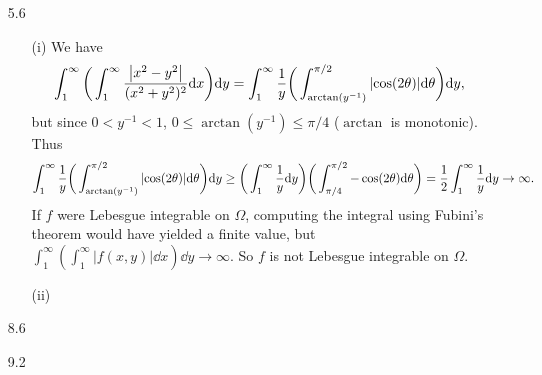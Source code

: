 \documentclass[11pt]{article}
\begin{document}
\begin{enumerate}
    \item[5.6] \begin{enumerate}
        \item[(i)] We have \[\int_1^\infty\bigg(\int_1^\infty \frac{\abs{x^2-y^2}}{(x^2+y^2)^2} \dd x\bigg)\dd y = \int_{1}^\infty \frac{1}{y} \bigg(\int_{\arctan(y^{-1})}^{\pi/2}\abs{\cos(2\theta)}\dd \theta\bigg) \dd y,\] but since $0<y^{-1}< 1$, $0 \leq \arctan(y^{-1})\leq \pi/4$ ($\arctan$ is monotonic). Thus \[\int_{1}^\infty \frac{1}{y} \bigg(\int_{\arctan(y^{-1})}^{\pi/2}\abs{\cos(2\theta)}\dd \theta\bigg) \dd y\geq \bigg(\int_{1}^\infty \frac{1}{y} \dd y\bigg)\bigg(\int_{\pi/4}^{\pi/2}-\cos(2\theta)\dd \theta\bigg) = \frac{1}{2}\int_1^\infty \frac{1}{y}\dd y \to \infty.\] If $f$ were Lebesgue integrable on $\Omega$, computing the integral using Fubini's theorem would have yielded a finite value, but $\int_1^\infty (\int_1^\infty |f(x,y)|\dd x) \dd y \to \infty$. So $f$ is not Lebesgue integrable on $\Omega$.
        \item[(ii)]
    \end{enumerate}
    \item[8.6]
    \item[9.2]
\end{enumerate}
\vspace*{7em}
\end{document}
